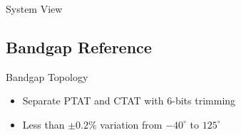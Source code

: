 \documentclass[10pt]{beamer}
\begin{document}
\begin{frame}{System View}

\begin{figure}[h]
\end{figure}

\end{frame}


\subsection{Bandgap Reference}

\begin{frame}{Bandgap Topology}

\begin{figure}[h]
\end{figure}

\begin{itemize}
 \item Separate PTAT and CTAT with 6-bits trimming
 \item Less than $\pm 0.2 \% $ variation from $-40 ^{\circ}$ to $125 ^{\circ}$
\end{itemize}

\end{frame}
\end{document}
